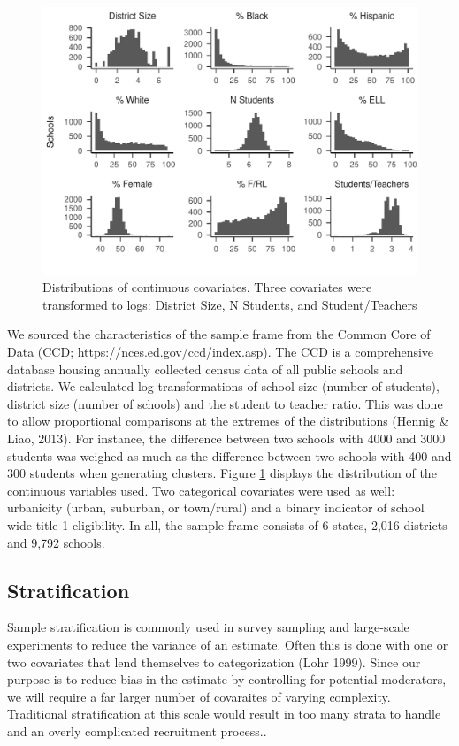 \documentclass[man,floatsintext]{apa6}
\begin{document}
\begin{figure}
\centering
\includegraphics{GenSamp-Paper_files/figure-latex/plot-dist1-1.pdf}
\caption{\label{fig:plot-dist1}Distributions of continuous covariates. Three covariates were transformed to logs: District Size, N Students, and Student/Teachers}
\end{figure}

We sourced the characteristics of the sample frame from the Common Core of Data (CCD; \url{https://nces.ed.gov/ccd/index.asp}). The CCD is a comprehensive database housing annually collected census data of all public schools and districts. We calculated log-transformations of school size (number of students), district size (number of schools) and the student to teacher ratio. This was done to allow proportional comparisons at the extremes of the distributions (Hennig \& Liao, 2013). For instance, the difference between two schools with 4000 and 3000 students was weighed as much as the difference between two schools with 400 and 300 students when generating clusters. Figure \ref{fig:plot-dist1} displays the distribution of the continuous variables used. Two categorical covariates were used as well: urbanicity (urban, suburban, or town/rural) and a binary indicator of school wide title 1 eligibility. In all, the sample frame consists of 6 states, 2,016 districts and 9,792 schools.

\hypertarget{stratification}{%
\subsection{Stratification}\label{stratification}}

Sample stratification is commonly used in survey sampling and large-scale experiments to reduce the variance of an estimate. Often this is done with one or two covariates that lend themselves to categorization (Lohr 1999). Since our purpose is to reduce bias in the estimate by controlling for potential moderators, we will require a far larger number of covaraites of varying complexity. Traditional stratification at this scale would result in too many strata to handle and an overly complicated recruitment process..
\end{document}
